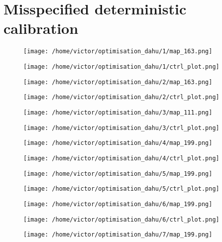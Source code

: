 \documentclass[../../Main_ManuscritThese.tex]{subfiles}
\begin{document}
\section{Misspecified deterministic calibration}
\clearpage
\begin{figure}[ht]
  \centering
  \texttt{[image: /home/victor/optimisation\_dahu/1/map\_163.png]}
\end{figure}
\begin{figure}[ht]
  \centering
  \texttt{[image: /home/victor/optimisation\_dahu/1/ctrl\_plot.png]}
\end{figure}
\clearpage
\begin{figure}[ht]
  \centering
  \texttt{[image: /home/victor/optimisation\_dahu/2/map\_163.png]}
\end{figure}
\begin{figure}[ht]
  \centering
  \texttt{[image: /home/victor/optimisation\_dahu/2/ctrl\_plot.png]}
\end{figure}
\clearpage
\begin{figure}[ht]
  \centering
  \texttt{[image: /home/victor/optimisation\_dahu/3/map\_111.png]}
\end{figure}
\begin{figure}[ht]
  \centering
  \texttt{[image: /home/victor/optimisation\_dahu/3/ctrl\_plot.png]}
\end{figure}
\clearpage
\begin{figure}[ht]
  \centering
  \texttt{[image: /home/victor/optimisation\_dahu/4/map\_199.png]}
\end{figure}
\begin{figure}[ht]
  \centering
  \texttt{[image: /home/victor/optimisation\_dahu/4/ctrl\_plot.png]}
\end{figure}
\clearpage
\begin{figure}[ht]
  \centering
  \texttt{[image: /home/victor/optimisation\_dahu/5/map\_199.png]}
\end{figure}
\begin{figure}[ht]
  \centering
  \texttt{[image: /home/victor/optimisation\_dahu/5/ctrl\_plot.png]}
\end{figure}
\clearpage
\begin{figure}[ht]
  \centering
  \texttt{[image: /home/victor/optimisation\_dahu/6/map\_199.png]}
\end{figure}
\begin{figure}[ht]
  \centering
  \texttt{[image: /home/victor/optimisation\_dahu/6/ctrl\_plot.png]}
\end{figure}
\clearpage
\begin{figure}[ht]
  \centering
  \texttt{[image: /home/victor/optimisation\_dahu/7/map\_199.png]}
\end{figure}
\end{document}
